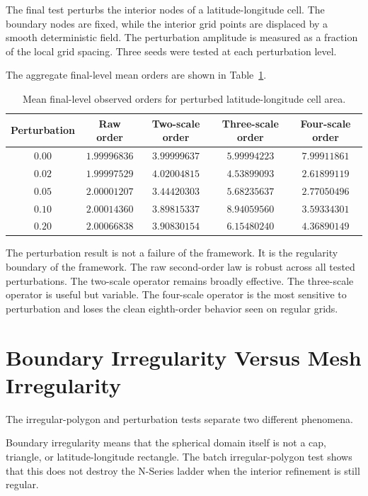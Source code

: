 \documentclass[11pt]{article}
\begin{document}
The final test perturbs the interior nodes of a latitude-longitude cell.  The
boundary nodes are fixed, while the interior grid points are displaced by a
smooth deterministic field.  The perturbation amplitude is measured as a
fraction of the local grid spacing.  Three seeds were tested at each
perturbation level.

The aggregate final-level mean orders are shown in
Table~\ref{tab:perturb-orders}.

\begin{table}[ht]
\centering
\small
\begin{tabular}{ccccc}
\toprule
Perturbation & Raw order & Two-scale order & Three-scale order & Four-scale order \\
\midrule
$0.00$ & $1.99996836$ & $3.99999637$ & $5.99994223$ & $7.99911861$ \\
$0.02$ & $1.99997529$ & $4.02004815$ & $4.53899093$ & $2.61899119$ \\
$0.05$ & $2.00001207$ & $3.44420303$ & $5.68235637$ & $2.77050496$ \\
$0.10$ & $2.00014360$ & $3.89815337$ & $8.94059560$ & $3.59334301$ \\
$0.20$ & $2.00066838$ & $3.90830154$ & $6.15480240$ & $4.36890149$ \\
\bottomrule
\end{tabular}
\caption{Mean final-level observed orders for perturbed latitude-longitude
cell area.}
\label{tab:perturb-orders}
\end{table}

The perturbation result is not a failure of the framework.  It is the
regularity boundary of the framework.  The raw second-order law is robust
across all tested perturbations.  The two-scale operator remains broadly
effective.  The three-scale operator is useful but variable.  The four-scale
operator is the most sensitive to perturbation and loses the clean
eighth-order behavior seen on regular grids.

\section{Boundary Irregularity Versus Mesh Irregularity}

The irregular-polygon and perturbation tests separate two different
phenomena.

Boundary irregularity means that the spherical domain itself is not a cap,
triangle, or latitude-longitude rectangle.  The batch irregular-polygon test
shows that this does not destroy the N-Series ladder when the interior
refinement is still regular.
\end{document}
